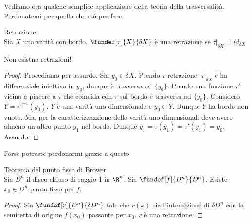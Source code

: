 Vediamo ora qualche semplice applicazione della teoria della trasversalità.
Perdonatemi per quello che stò per fare.

\begin{defn}Retrazione\\
Sia $X$ una varità con bordo. $\fundef[\tau]{X}{\delta X}$ è una retrazione se $\tau|_{\delta X}=id_{\delta X}$
\end{defn}

\begin{teo}
Non esistno retrazioni!
\end{teo}
\begin{proof}
Procediamo per assurdo. Sia $y_0 \in \delta X$. Prendo $\tau$ retrazione. $\tau|_{\delta X}$ è ha differenziale iniettivo in $y_0$, dunque è trasversa ad $\{y_0\}$. Prendo una funzione $\tau'$ vicina a piacere a $\tau$ che coincida con $\tau$ sul bordo e trasversa ad $\{y_0\}$. Considero $Y=\tau'^{-1}(y_0)$. $Y$ è una varità uno dimensionale e $y_0\in Y$. Dunque $Y$ ha bordo non vuoto. Ma, per la caratterizzazzione delle varità uno dimensionali deve avere almeno un altro punto $y_1$ nel bordo. Dunque $y_1=\tau(y_1)=\tau'(y_1)=y_0$. Assurdo.  
\end{proof}
Forse potreste perdonarmi grazie a questo
\begin{teo}
Teorema del punto fisso di Brower\\
Sia $D^n$ il disco chiuso di raggio 1 in $\R^n$. Sia $\fundef[f]{D^n}{D^n}$. Esiste $x_0\in D^n$ punto fisso per $f$.
\end{teo}
\begin{proof}
Sia $\fundef[r]{D^n}{\delta D^n}$ tale che $r(x)$ sia l'intersezione di $\delta D^n$ con la semiretta di origine $f(x_0)$ passante per $x_0$. $r$ è una retrazione. 
\end{proof}





